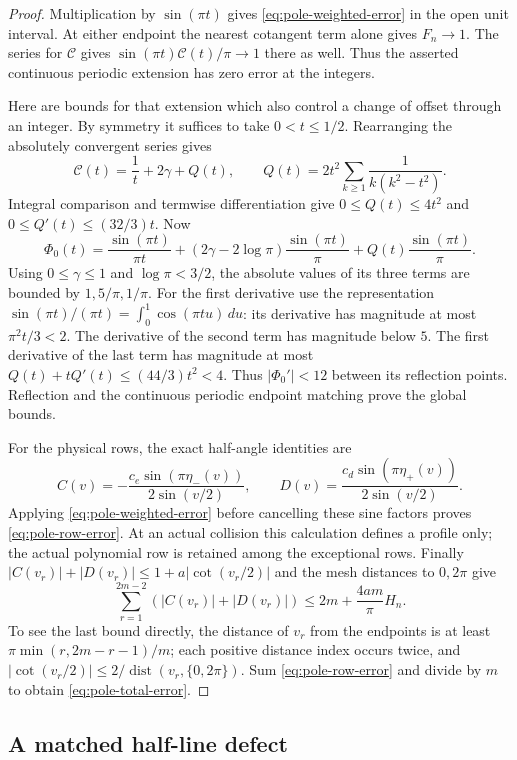 \begin{proof}
Multiplication by $\sin(\pi t)$ gives
\eqref{eq:pole-weighted-error} in the open unit interval.
At either endpoint the nearest cotangent term alone gives $F_n\to1$.
The series for $\mathcal C$ gives
$\sin(\pi t)\mathcal C(t)/\pi\to1$ there as well.
Thus the asserted continuous periodic extension has zero error at
the integers.

Here are bounds for that extension which also control a change of
offset through an integer.  By symmetry it suffices to take
$0<t\leq1/2$.  Rearranging the absolutely convergent series gives
\[
 \mathcal C(t)=\frac1t+2\gamma+Q(t),\qquad
 Q(t)=2t^2\sum_{k\geq1}\frac1{k(k^2-t^2)}.
\]
Integral comparison and termwise differentiation give
$0\leq Q(t)\leq4t^2$ and $0\leq Q'(t)\leq(32/3)t$.
Now
\[
 \Phi_0(t)=\frac{\sin(\pi t)}{\pi t}
  +(2\gamma-2\log\pi)\frac{\sin(\pi t)}\pi
  +Q(t)\frac{\sin(\pi t)}\pi.
\]
Using $0\leq\gamma\leq1$ and $\log\pi<3/2$, the absolute
values of its three terms are bounded by $1,5/\pi,1/\pi$.
For the first derivative use the representation
$\sin(\pi t)/(\pi t)=\int_0^1\cos(\pi tu)\,du$:
its derivative has magnitude at most $\pi^2t/3<2$.
The derivative of the second term has magnitude below $5$.
The first derivative of the last term has magnitude at most
$Q(t)+tQ'(t)\leq(44/3)t^2<4$.
Thus $|\Phi_0'|<12$ between its reflection points.
Reflection and the continuous periodic endpoint matching prove the
global bounds.

For the physical rows, the exact half-angle identities are
\[
 C(v)=-\frac{c_e\sin(\pi\eta_-(v))}{2\sin(v/2)},\qquad
 D(v)= \frac{c_d\sin(\pi\eta_+(v))}{2\sin(v/2)}.
\]
Applying \eqref{eq:pole-weighted-error} before cancelling these
sine factors proves \eqref{eq:pole-row-error}.  At an actual collision
this calculation defines a profile only; the actual polynomial row is
retained among the exceptional rows.
Finally $|C(v_r)|+|D(v_r)|\leq1+a|\cot(v_r/2)|$ and the
mesh distances to $0,2\pi$ give
\[
 \sum_{r=1}^{2m-2}(|C(v_r)|+|D(v_r)|)
       \leq2m+\frac{4am}{\pi}H_n.
\]
To see the last bound directly, the distance of $v_r$ from the endpoints
is at least $\pi\min(r,2m-r-1)/m$; each positive distance index
occurs twice, and $|\cot(v_r/2)|\leq2/\operatorname{dist}
(v_r,\{0,2\pi\})$.  Sum \eqref{eq:pole-row-error} and divide
by $m$ to obtain \eqref{eq:pole-total-error}.
\end{proof}

\subsection{A matched half-line defect}

